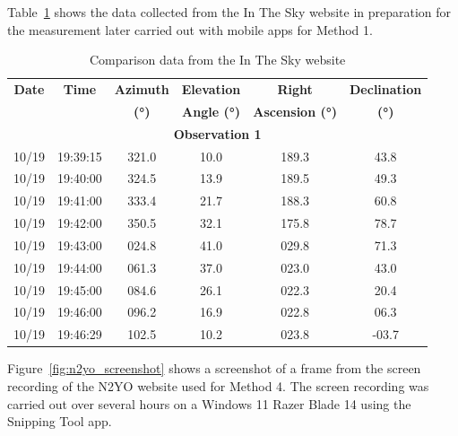 \documentclass{article}
\begin{document}
Table~\ref{tab:method1_data_comparison} shows the data collected from the In The Sky website in preparation for the measurement later carried out with mobile apps for Method 1.

\begin{table}[H]
    \centering
    \caption{Comparison data from the In The Sky website}
    \label{tab:method1_data_comparison}
    \renewcommand{\arraystretch}{1.2}
    \begin{tabular}{|c|c|c|c|c|c|}
        \hline
        \textbf{Date} & \textbf{Time} & \textbf{Azimuth} & \textbf{Elevation} & \textbf{Right} & \textbf{Declination} \\ 
        \textbf{ } & \textbf{ } & \textbf{(°)} & \textbf{Angle (°)} & \textbf{Ascension (°)} & \textbf{(°)} \\ \hline
        \multicolumn{6}{|c|}{\textbf{Observation 1}} \\ \hline
        10/19 & 19:39:15 & 321.0 & 10.0 & 189.3 & 43.8 \\ \hline
        10/19 & 19:40:00 & 324.5 & 13.9 & 189.5 & 49.3 \\ \hline
        10/19 & 19:41:00 & 333.4 & 21.7 & 188.3 & 60.8 \\ \hline
        10/19 & 19:42:00 & 350.5 & 32.1 & 175.8 & 78.7 \\ \hline
        10/19 & 19:43:00 & 024.8 & 41.0 & 029.8 & 71.3 \\ \hline
        10/19 & 19:44:00 & 061.3 & 37.0 & 023.0 & 43.0 \\ \hline
        10/19 & 19:45:00 & 084.6 & 26.1 & 022.3 & 20.4 \\ \hline
        10/19 & 19:46:00 & 096.2 & 16.9 & 022.8 & 06.3 \\ \hline
        10/19 & 19:46:29 & 102.5 & 10.2 & 023.8 & -03.7 \\ \hline
    \end{tabular}
\end{table}

\newpage
Figure~\ref{fig:n2yo_screenshot} shows a screenshot of a frame from the screen recording of the N2YO website used for Method 4. The screen recording was carried out over several hours on a Windows 11 Razer Blade 14 using the Snipping Tool app.
\end{document}
